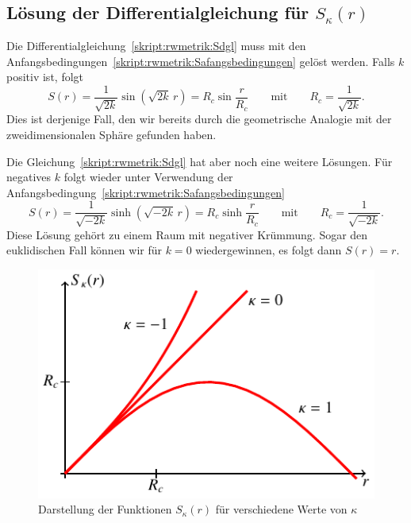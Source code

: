 \subsection{Lösung der Differentialgleichung für $S_\kappa(r)$}
Die Differentialgleichung~\eqref{skript:rwmetrik:Sdgl}
muss mit den Anfangsbedingungen~\eqref{skript:rwmetrik:Safangsbedingungen}
gelöst werden.
Falls $k$ positiv ist, folgt
\begin{equation}
S(r)=\frac1{\sqrt{2k}}\sin(\sqrt{2k}\,r) = R_c\sin\frac{r}{R_c}
\qquad\text{mit}\qquad
R_c=\frac1{\sqrt{2k}}.
\label{skript:rwmetrik:sinloesung}
\end{equation}
Dies ist derjenige Fall, den wir bereits durch die geometrische Analogie mit
der zweidimensionalen Sphäre gefunden haben.

Die Gleichung~\eqref{skript:rwmetrik:Sdgl} hat aber noch eine weitere 
Lösungen.
Für negatives $k$ folgt wieder unter Verwendung der
Anfangsbedingung~\eqref{skript:rwmetrik:Safangsbedingungen}
\begin{equation}
S(r)=\frac{1}{\sqrt{-2k}}\sinh(\sqrt{-2k}\, r)
=
R_c\sinh\frac{r}{R_c}
\qquad\text{mit}\qquad
R_c=\frac1{\sqrt{-2k}}.
\label{skript:rwmetrik:sinhloesung}
\end{equation}
Diese Lösung gehört zu einem Raum mit negativer Krümmung.
Sogar den euklidischen Fall können wir für $k=0$ wiedergewinnen, es folgt
dann $S(r)=r$.

\begin{figure}
\centering
\includegraphics{chapters/tikz/robertson.pdf}
\caption{Darstellung der Funktionen $S_\kappa(r)$ für 
verschiedene Werte von $\kappa$
\label{skript:Skappa:graph}}
\end{figure}

